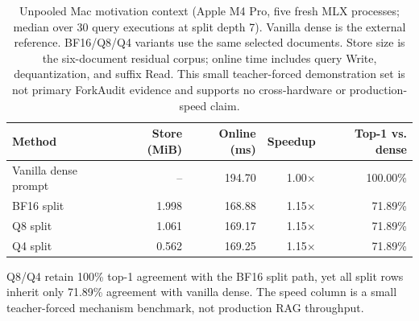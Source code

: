 \begin{table}[H]
\caption{Unpooled Mac motivation context (Apple M4 Pro, five fresh MLX processes; median over 30 query executions at split depth 7). Vanilla dense is the external reference. \qcomem{} BF16/Q8/Q4 variants use the same selected documents. Store size is the six-document residual corpus; online time includes query Write, dequantization, and suffix Read. This small teacher-forced demonstration set is not primary ForkAudit evidence and supports no cross-hardware or production-speed claim.}
\label{tab:mac-motivation}
\centering\scriptsize
\setlength{\tabcolsep}{2.7pt}
\begin{tabular}{@{}lrrrr@{}}
\toprule
Method & Store (MiB) & Online (ms) & Speedup & Top-1 vs. dense \\
\midrule
Vanilla dense prompt & -- & 194.70 & 1.00$\times$ & 100.00\% \\
\qcomem{} BF16 split & 1.998 & 168.88 & 1.15$\times$ & 71.89\% \\
\qcomem{} Q8 split & 1.061 & 169.17 & 1.15$\times$ & 71.89\% \\
\qcomem{} Q4 split & 0.562 & 169.25 & 1.15$\times$ & 71.89\% \\
\bottomrule
\end{tabular}
\vspace{0.5mm}
\parbox{0.98\linewidth}{\scriptsize Q8/Q4 retain 100\% top-1 agreement with the BF16 split path, yet all split rows inherit only 71.89\% agreement with vanilla dense. The speed column is a small teacher-forced mechanism benchmark, not production RAG throughput.}
\end{table}
